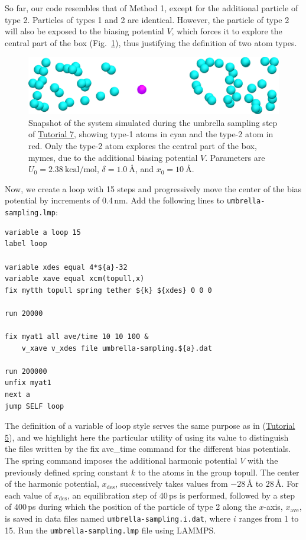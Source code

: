 \documentclass[9pt,tutorial]{livecoms}
\newcommand{\lmpcmd}[1]{\colorbox{listing}{\textcolor{command}{\small{#1}}}} %
\newcommand{\flecmd}[1]{\textcolor{command}{\texttt{#1}}} %
\begin{document}
So far, our code resembles that of Method 1, except for the additional particle
of type 2.  Particles of types 1 and 2 are identical.
However, the particle of type 2 will also
be exposed to the biasing potential $V$, which forces it to explore the
central part of the box (Fig.~\ref{fig:US-system-biased}), thus
justifying the definition of two atom types.

\begin{figure}
\centering
\includegraphics[width=\linewidth]{US-system-biased}
\caption{Snapshot of the system simulated during the umbrella sampling
step of \hyperref[umbrella-sampling-label]{Tutorial 7}, showing type-1 atoms
in cyan and the type-2 atom in red.  Only the type-2 atom explores the central part of the box,
\lmpcmd{mymes}, due to the additional biasing potential $V$. Parameters are
$U_0 = 2.38~\text{kcal/mol}$, $\delta = 1.0~\text{\AA{}}$, and $x_0 = 10~\text{\AA{}}$.}
\label{fig:US-system-biased}
\end{figure}

Now, we create a loop with 15 steps and progressively move the center of the
bias potential by increments of 0.4\,nm.  Add the following lines to \flecmd{umbrella-sampling.lmp}:
\begin{lstlisting}
variable a loop 15
label loop

variable xdes equal 4*${a}-32
variable xave equal xcm(topull,x)
fix mytth topull spring tether ${k} ${xdes} 0 0 0

run 20000

fix myat1 all ave/time 10 10 100 &
    v_xave v_xdes file umbrella-sampling.${a}.dat

run 200000
unfix myat1
next a
jump SELF loop
\end{lstlisting}
The definition of a variable of loop style serves the same purpose
as in (\hyperref[reactive-silicon-dioxide-label]{Tutorial 5}), and we highlight
here the particular utility of using its value
to distinguish the files written by the \lmpcmd{fix ave\_time} command for the
different bias potentials.
The \lmpcmd{spring} command imposes the additional harmonic potential $V$ with
the previously defined spring constant $k$ to the atoms in the group \lmpcmd{topull}.  The center of the harmonic
potential, $x_\text{des}$, successively takes values
from $-28\,\text{\AA{}}$ to $28\,\text{\AA{}}$.  For each value of $x_\text{des}$,
an equilibration step of 40\,ps is performed, followed by a step
of 400\,ps during which the position of the particle of
type 2 along the $x$-axis, $x_\text{ave}$, is saved in data files named \flecmd{umbrella-sampling.i.dat},
where $i$ ranges from 1 to 15.  Run the \flecmd{umbrella-sampling.lmp} file using LAMMPS.
\end{document}
